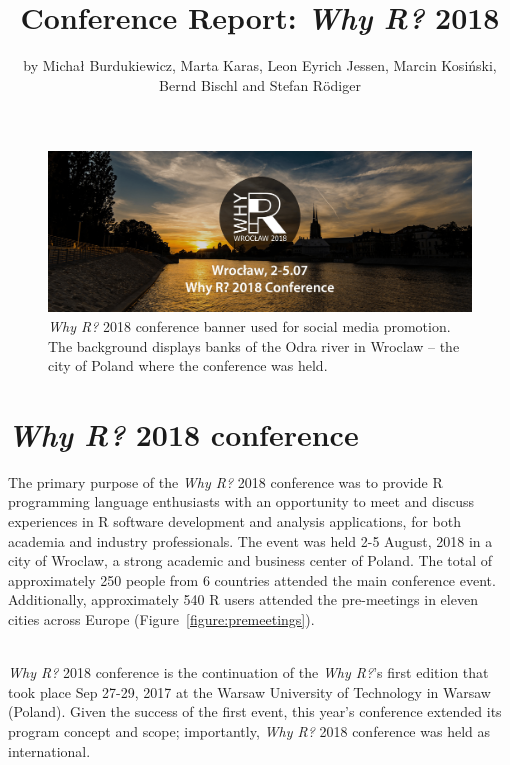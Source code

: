 \title{Conference Report: \emph{Why R?} 2018}
\author{by Micha\l{} Burdukiewicz, Marta Karas, Leon Eyrich Jessen, Marcin Kosi\'{n}ski, Bernd Bischl and Stefan R\"odiger}

\maketitle

\begin{figure}[htbp]
  \centering
  \includegraphics[width=0.8\columnwidth]{whyr_banner}
  \caption{\emph{Why R?} 2018 conference banner used for social media promotion. The background displays banks of the Odra river in Wroclaw -- the city of Poland where the conference was held.}
  \label{figure:whyr_banner}
\end{figure}



\section{\emph{Why R?} 2018 conference}

The primary purpose of the \emph{Why R?} 2018 conference was to provide R programming language enthusiasts with an opportunity to meet and discuss experiences in R software development and analysis applications, for both  academia and industry professionals. The event was held 2-5 August, 2018 in a city of Wroclaw, a strong academic and business center of Poland. The total of approximately 250 people from 6 countries attended the main conference event. Additionally, approximately 540 R users attended the pre-meetings in eleven cities across Europe (Figure~\ref{figure:premeetings}).

~\\ \emph{Why R?} 2018 conference is the continuation of the \emph{Why R?}'s first edition that took place Sep 27-29, 2017 at the Warsaw University of Technology in Warsaw (Poland). Given the success of the first event, this year's conference extended its program concept and scope; importantly, \emph{Why R?} 2018 conference  was held as international. 

